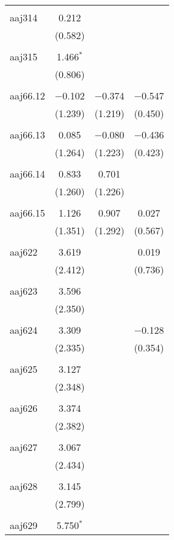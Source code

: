 \begin{table}[!htbp]
\begin{tabular}{@{\extracolsep{5pt}}lccc}
  & & & \\ 
 aaj314 & 0.212 &  &  \\ 
  & (0.582) &  &  \\ 
  & & & \\ 
 aaj315 & 1.466$^{*}$ &  &  \\ 
  & (0.806) &  &  \\ 
  & & & \\ 
 aaj66.12 & $-$0.102 & $-$0.374 & $-$0.547 \\ 
  & (1.239) & (1.219) & (0.450) \\ 
  & & & \\ 
 aaj66.13 & 0.085 & $-$0.080 & $-$0.436 \\ 
  & (1.264) & (1.223) & (0.423) \\ 
  & & & \\ 
 aaj66.14 & 0.833 & 0.701 &  \\ 
  & (1.260) & (1.226) &  \\ 
  & & & \\ 
 aaj66.15 & 1.126 & 0.907 & 0.027 \\ 
  & (1.351) & (1.292) & (0.567) \\ 
  & & & \\ 
 aaj622 & 3.619 &  & 0.019 \\ 
  & (2.412) &  & (0.736) \\ 
  & & & \\ 
 aaj623 & 3.596 &  &  \\ 
  & (2.350) &  &  \\ 
  & & & \\ 
 aaj624 & 3.309 &  & $-$0.128 \\ 
  & (2.335) &  & (0.354) \\ 
  & & & \\ 
 aaj625 & 3.127 &  &  \\ 
  & (2.348) &  &  \\ 
  & & & \\ 
 aaj626 & 3.374 &  &  \\ 
  & (2.382) &  &  \\ 
  & & & \\ 
 aaj627 & 3.067 &  &  \\ 
  & (2.434) &  &  \\ 
  & & & \\ 
 aaj628 & 3.145 &  &  \\ 
  & (2.799) &  &  \\ 
  & & & \\ 
 aaj629 & 5.750$^{*}$ &  &  \\ 

\end{tabular}
\end{table}
